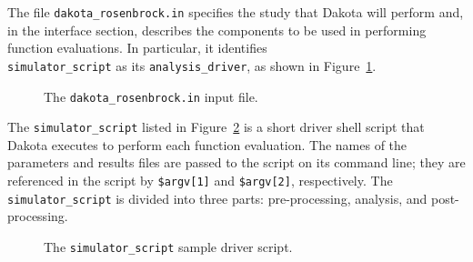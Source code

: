 The file \texttt{dakota\_rosenbrock.in} specifies the study that
Dakota will perform and, in the interface section, describes the
components to be used in performing function evaluations. In
particular, it identifies \\ \texttt{simulator\_script} as its
\texttt{analysis\_driver}, as shown in Figure~\ref{advint:figure01}.
\begin{figure}
  \centering
  \begin{bigbox}
    \begin{small}
    \end{small}
  \end{bigbox}
  \caption{The \texttt{dakota\_rosenbrock.in} input file.}
  \label{advint:figure01}
\end{figure}

The \texttt{simulator\_script} listed in Figure~\ref{advint:figure02}
is a short driver shell script that Dakota executes to perform each
function evaluation. The names of the parameters and results files are
passed to the script on its command line; they are
referenced in the script by \texttt{\$argv[1]}
and \texttt{\$argv[2]}, respectively. The \texttt{simulator\_script}
is divided into three parts: pre-processing, analysis, and post-processing.

\begin{figure}
  \centering
  \begin{bigbox}
    \begin{small}
    \end{small}
  \end{bigbox}
  \caption{The \texttt{simulator\_script} sample driver script.}
  \label{advint:figure02}
\end{figure}


